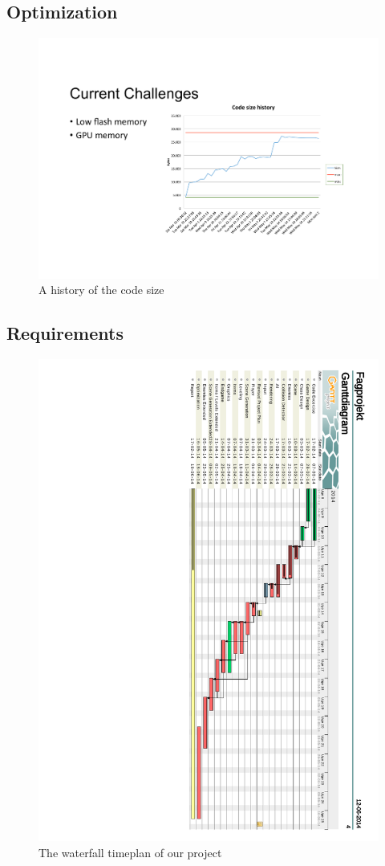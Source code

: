 \documentclass[12pt]{report}
\begin{document}
\subsection*{Optimization}
\begin{figure}[h]
  \centering
  \includegraphics[scale=0.8]{Figures/CodeSizeChart}
  \caption{A history of the code size}
  \label{fig:code_size}
\end{figure}
\newpage
\subsection*{Requirements}
\begin{figure}[h]
  \centering
  \includegraphics[scale=0.55]{Figures/Tidsplan2}
  \caption{The waterfall timeplan of our project}
  \label{fig:Waterfall_chart}
\end{figure}
\end{document}
